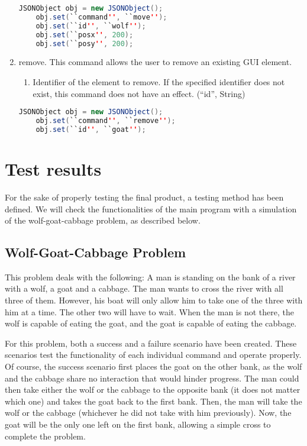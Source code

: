 \documentclass[11pt,a4paper]{article}
\begin{document}
\begin{enumerate}
\begin{enumerate}
		\end{enumerate}
	\begin{lstlisting}[language=java]
	JSONObject obj = new JSONObject();
	obj.set(``command'', ``move'');
	obj.set(``id'', ``wolf'');
	obj.set(``posx'', 200);
	obj.set(``posy'', 200);
	\end{lstlisting}
	\item remove. This command allows the user to remove an existing GUI element.
		\begin{enumerate}
			\item Identifier of the element to remove. If the specified identifier does not exist, this command does not have an effect. (``id'', String)
		\end{enumerate}
	\begin{lstlisting}[language=java]
	JSONObject obj = new JSONObject();
	obj.set(``command'', ``remove'');
	obj.set(``id'', ``goat'');
	\end{lstlisting}
\end{enumerate}


\section{Test results}

For the sake of properly testing the final product, a testing method has been defined. We will check the functionalities of the main program with a simulation of the wolf-goat-cabbage problem, as described below.

\subsection{Wolf-Goat-Cabbage Problem}
This problem deals with the following: A man is standing on the bank of a river with a wolf, a goat and a cabbage. The man wants to cross the river with all three of them. However, his boat will only allow him to take one of the three with him at a time. The other two will have to wait. When the man is not there, the wolf is capable of eating the goat, and the goat is capable of eating the cabbage.

For this problem, both a success and a failure scenario have been created. These scenarios test the functionality of each individual command and operate properly. Of course, the success scenario first places the goat on the other bank, as the wolf and the cabbage share no interaction that would hinder progress. The man could then take either the wolf or the cabbage to the opposite bank (it does not matter which one) and takes the goat back to the first bank. Then, the man will take the wolf or the cabbage (whichever he did not take with him previously). Now, the goat will be the only one left on the first bank, allowing a simple cross to complete the problem.
\end{document}
